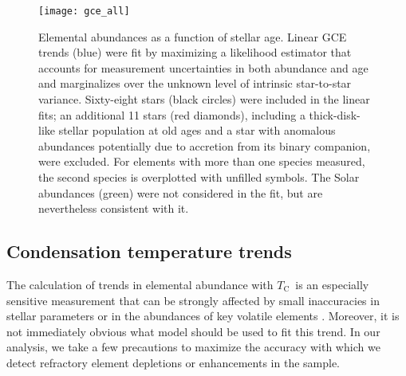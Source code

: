 \documentclass[twocolumn]{aastex62}
\newcommand{\tc}{$T_\mathrm{C}$}
\newcommand{\acronym}[1]{{\small{#1}}}
\begin{document}
\begin{figure*}
\centering
\texttt{[image: gce\_all]}
\caption{Elemental abundances as a function of stellar age. Linear \acronym{GCE} trends (blue) were fit by maximizing a likelihood estimator that accounts for measurement uncertainties in both abundance and age and marginalizes over the unknown level of intrinsic star-to-star variance. Sixty-eight stars (black circles) were included in the linear fits; an additional 11 stars (red diamonds), including a thick-disk-like stellar population at old ages and a star with anomalous abundances potentially due to accretion from its binary companion, were excluded. For elements with more than one species measured, the second species is overplotted with unfilled symbols. The Solar abundances (green) were not considered in the fit, but are nevertheless consistent with it.}
\label{fig:gce}
\end{figure*}

\subsection{Condensation temperature trends}
\label{s:tc}

The calculation of trends in elemental abundance with \tc\ is an especially sensitive measurement that can be strongly affected by small inaccuracies in stellar parameters or in the abundances of key volatile elements \citep[e.g.][]{teske16, adibekyan16}. 
Moreover, it is not immediately obvious what model should be used to fit this trend. 
In our analysis, we take a few precautions to maximize the accuracy with which we detect refractory element depletions or enhancements in the sample.
\end{document}

